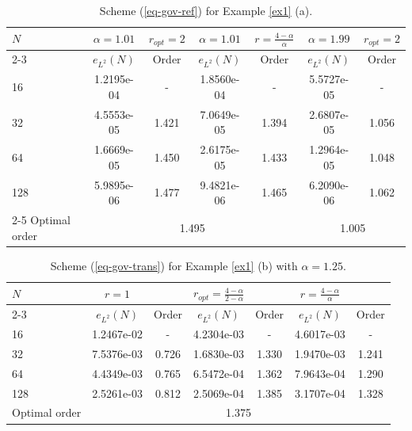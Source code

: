 \documentclass[11pt]{article}
\numberwithin{equation}{section}
\begin{document}
\begin{table}[!ht]
\caption{Scheme (\ref{eq-gov-ref}) for Example \ref{ex1} (a).}
\renewcommand{\arraystretch}{1}
\def\temptablewidth{1\textwidth}
\begin{center}
 \begin{tabular*}{\temptablewidth}{@{\extracolsep{\fill}}lcccccc}\hline
 $N$ & $\alpha=1.01$   &$r_{opt}=2$   &$\alpha=1.01$      &$r=\frac{4-\alpha}{\alpha}$     &$\alpha=1.99$  &$r_{opt}=2$    \\ 
 \cline{2-3}\cline{4-5}\cline{6-7}
 & $e_{L^{2}}(N)$         &Order     &$e_{L^{2}}(N)$    &Order    &$e_{L^{2}}(N)$ &Order     \\ \hline
 16 &1.2195e-04     &-      &1.8560e-04   &-       &5.5727e-05  &-  \\ 
 32 &4.5553e-05     &1.421  &7.0649e-05   &1.394   &2.6807e-05  &1.056    \\ 
 64 &1.6669e-05     &1.450  &2.6175e-05   &1.433   &1.2964e-05  &1.048 \\ 
 128 &5.9895e-06    &1.477  &9.4821e-06   &1.465   &6.2090e-06  &1.062    \\ 
 \cline{2-5}\cline{6-7}
 Optimal order  &\multicolumn{4}{c}{1.495} &\multicolumn{2}{c}{1.005} \\ \hline
\end{tabular*}
\end{center}
\end{table}


\begin{table}[!ht]
\caption{Scheme (\ref{eq-gov-trans}) for Example \ref{ex1} (b) with $\alpha=1.25$.}
\renewcommand{\arraystretch}{1}
\def\temptablewidth{1\textwidth}
\begin{center}
 \begin{tabular*}{\temptablewidth}{@{\extracolsep{\fill}}lcccccc}\hline
 $N$ & $r=1$   &   &$r_{opt}=\frac{4-\alpha}{2-\alpha}$      &     &$r=\frac{4-\alpha}{\alpha}$  &    \\ 
 \cline{2-3}\cline{4-5}\cline{6-7}
 & $e_{L^{2}}(N)$         &Order     &$e_{L^{2}}(N)$    &Order    &$e_{L^{2}}(N)$ &Order     \\ \hline
 16 &1.2467e-02     &-      &4.2304e-03   &-       &4.6017e-03  &-  \\ 
 32 &7.5376e-03     &0.726  &1.6830e-03   &1.330   &1.9470e-03  &1.241    \\ 
 64 &4.4349e-03     &0.765  &6.5472e-04   &1.362   &7.9643e-04  &1.290 \\ 
 128 &2.5261e-03    &0.812  &2.5069e-04   &1.385   &3.1707e-04  &1.328    \\ 
 Optimal order  &\multicolumn{6}{c}{1.375} \\ \hline
\end{tabular*}
\end{center}
\end{table}
\end{document}
